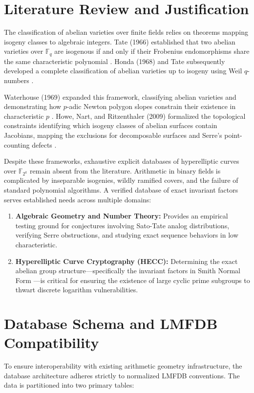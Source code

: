 \documentclass[letterpaper, 11pt]{article}
\begin{document}
\section{Literature Review and Justification}
The classification of abelian varieties over finite fields relies on theorems mapping isogeny classes to algebraic integers. Tate (1966) established that two abelian varieties over $\mathbb{F}_q$ are isogenous if and only if their Frobenius endomorphisms share the same characteristic polynomial \cite{Tate1966}. Honda (1968) and Tate subsequently developed a complete classification of abelian varieties up to isogeny using Weil $q$-numbers \cite{Honda1968}. 

Waterhouse (1969) expanded this framework, classifying abelian varieties and demonstrating how $p$-adic Newton polygon slopes constrain their existence in characteristic $p$ \cite{Waterhouse1969}. Howe, Nart, and Ritzenthaler (2009) formalized the topological constraints identifying which isogeny classes of abelian surfaces contain Jacobians, mapping the exclusions for decomposable surfaces and Serre's point-counting defects \cite{Howe2009}. 

Despite these frameworks, exhaustive explicit databases of hyperelliptic curves over $\mathbb{F}_{2^k}$ remain absent from the literature. Arithmetic in binary fields is complicated by inseparable isogenies, wildly ramified covers, and the failure of standard polynomial algorithms. A verified database of exact invariant factors serves established needs across multiple domains:
\begin{enumerate}
    \item \textbf{Algebraic Geometry and Number Theory:} Provides an empirical testing ground for conjectures involving Sato-Tate analog distributions, verifying Serre obstructions, and studying exact sequence behaviors in low characteristic.
    \item \textbf{Hyperelliptic Curve Cryptography (HECC):} Determining the exact abelian group structure---specifically the invariant factors in Smith Normal Form \cite{Smith1861}---is critical for ensuring the existence of large cyclic prime subgroups to thwart discrete logarithm vulnerabilities.
\end{enumerate}

\section{Database Schema and LMFDB Compatibility}
To ensure interoperability with existing arithmetic geometry infrastructure, the database architecture adheres strictly to normalized LMFDB conventions. The data is partitioned into two primary tables:
\end{document}

